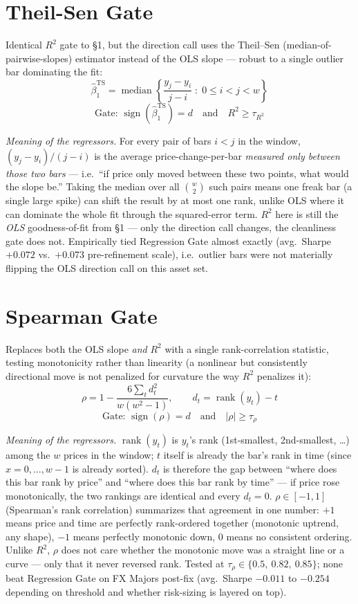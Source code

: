 \documentclass[11pt]{article}
\newcommand{\meaningpar}[1]{\par\noindent\textit{Meaning of the regressors.} #1}
\begin{document}
\section{Theil-Sen Gate}
Identical $R^2$ gate to \S1, but the direction call uses the Theil--Sen (median-of-pairwise-slopes)
estimator instead of the OLS slope --- robust to a single outlier bar dominating the fit:
\[
\hat\beta_1^{\mathrm{TS}} = \operatorname{median}\left\{ \frac{y_j - y_i}{j - i} \;:\; 0\le i<j< w \right\}
\]
\[
\text{Gate: } \operatorname{sign}(\hat\beta_1^{\mathrm{TS}}) = d \quad \text{and} \quad R^2 \ge \tau_{R^2}
\]
\meaningpar{For every pair of bars $i<j$ in the window, $(y_j-y_i)/(j-i)$ is the average
price-change-per-bar \emph{measured only between those two bars} --- i.e.\ ``if price only
moved between these two points, what would the slope be.'' Taking the median over all
$\binom{w}{2}$ such pairs means one freak bar (a single large spike) can shift the result by
at most one rank, unlike OLS where it can dominate the whole fit through the squared-error
term. $R^2$ here is still the \emph{OLS} goodness-of-fit from \S1 --- only the direction call
changes, the cleanliness gate does not. Empirically tied Regression Gate almost exactly (avg.\
Sharpe $+0.072$ vs.\ $+0.073$ pre-refinement scale), i.e.\ outlier bars were not materially
flipping the OLS direction call on this asset set.}

\section{Spearman Gate}
Replaces both the OLS slope \emph{and} $R^2$ with a single rank-correlation statistic, testing
monotonicity rather than linearity (a nonlinear but consistently directional move is not penalized
for curvature the way $R^2$ penalizes it):
\[
\rho = 1 - \frac{6\sum_t d_t^2}{w(w^2-1)}, \qquad d_t = \operatorname{rank}(y_t) - t
\]
\[
\text{Gate: } \operatorname{sign}(\rho) = d \quad \text{and} \quad |\rho| \ge \tau_\rho
\]
\meaningpar{$\operatorname{rank}(y_t)$ is $y_t$'s rank (1st-smallest, 2nd-smallest, \dots) among
the $w$ prices in the window; $t$ itself is already the bar's rank in time (since $x=0,\dots,w-1$
is already sorted). $d_t$ is therefore the gap between ``where does this bar rank by price'' and
``where does this bar rank by time'' --- if price rose monotonically, the two rankings are
identical and every $d_t=0$. $\rho\in[-1,1]$ (Spearman's rank correlation) summarizes that
agreement in one number: $+1$ means price and time are perfectly rank-ordered together
(monotonic uptrend, any shape), $-1$ means perfectly monotonic down, $0$ means no consistent
ordering. Unlike $R^2$, $\rho$ does not care whether the monotonic move was a straight line or a
curve --- only that it never reversed rank. Tested at $\tau_\rho \in \{0.5,\ 0.82,\ 0.85\}$; none
beat Regression Gate on FX Majors post-fix (avg.\ Sharpe $-0.011$ to $-0.254$ depending on
threshold and whether risk-sizing is layered on top).}
\end{document}
